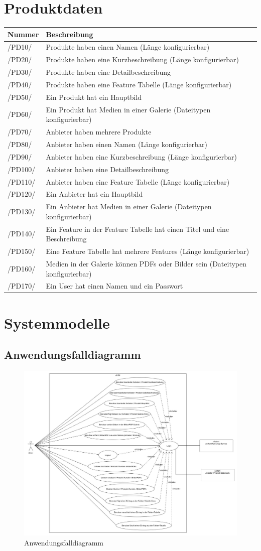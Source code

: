 \documentclass[a4paper,12pt]{article}
\newcommand\addrow[2]{#1 &#2\\ }
\newcommand\addheading[2]{#1 &#2\\ \hline}
\newcommand\tabularhead{\begin{tabular}{lp{13cm}}
\hline
}
\newenvironment{usecase}{\tabularhead}
{\hline\end{tabular}}
\begin{document}
\clearpage

\section{Produktdaten}
\begin{usecase}
  \addheading{Nummer}{Beschreibung} 
  \addrow{/PD10/}{Produkte haben einen Namen (Länge konfigurierbar)}
  \addrow{/PD20/}{Produkte haben eine Kurzbeschreibung (Länge konfigurierbar)}
  \addrow{/PD30/}{Produkte haben eine Detailbeschreibung}
  \addrow{/PD40/}{Produkte haben eine Feature Tabelle (Länge konfigurierbar)}
  \addrow{/PD50/}{Ein Produkt hat ein Hauptbild}
  \addrow{/PD60/}{Ein Produkt hat Medien in einer Galerie (Dateitypen konfigurierbar)}
  \addrow{/PD70/}{Anbieter haben mehrere Produkte}
  \addrow{/PD80/}{Anbieter haben einen Namen (Länge konfigurierbar)}
  \addrow{/PD90/}{Anbieter haben eine Kurzbeschreibung (Länge konfigurierbar)}
  \addrow{/PD100/}{Anbieter haben eine Detailbeschreibung}
  \addrow{/PD110/}{Anbieter haben eine Feature Tabelle (Länge konfigurierbar)}
  \addrow{/PD120/}{Ein Anbieter hat ein Hauptbild}
  \addrow{/PD130/}{Ein Anbieter hat Medien in einer Galerie (Dateitypen konfigurierbar)}
  \addrow{/PD140/}{Ein Feature in der Feature Tabelle hat einen Titel und eine Beschreibung}
  \addrow{/PD150/}{Eine Feature Tabelle hat mehrere Features (Länge konfigurierbar)}
  \addrow{/PD160/}{Medien in der Galerie können PDFs oder Bilder sein (Dateitypen konfigurierbar)}
  \addrow{/PD170/}{Ein User hat einen Namen und ein Passwort}
\end{usecase}

\clearpage

\section{Systemmodelle}

\subsection{Anwendungsfalldiagramm}
\begin{figure}[!htb]
  \centering
     \includegraphics[width=1.0\textwidth]{use-case-diagram.jpeg}
  \caption{Anwendungsfalldiagramm}
  \label{fig:file-upload}
\end{figure}
\end{document}
